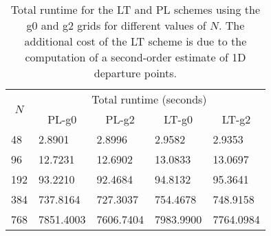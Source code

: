 \begin{table}[!h]
	\begin{tabular}{|l|llll|}
		\hline
		\multicolumn{1}{|c|}{\multirow{2}{*}{\textbf{$N$}}} & \multicolumn{4}{c|}{Total runtime (seconds)}                                                                              \\ \cline{2-5} 
		\multicolumn{1}{|c|}{}                              & \multicolumn{1}{c|}{PL-g0}     & \multicolumn{1}{c|}{PL-g2}     & \multicolumn{1}{c|}{LT-g0}     & \multicolumn{1}{c|}{LT-g2} \\ \hline
		48                                                  & \multicolumn{1}{l|}{2.8901}    & \multicolumn{1}{l|}{2.8996}    & \multicolumn{1}{l|}{2.9582}    & 2.9353                     \\ \hline
		96                                                  & \multicolumn{1}{l|}{12.7231}   & \multicolumn{1}{l|}{12.6902}   & \multicolumn{1}{l|}{13.0833}   & 13.0697                    \\ \hline
		192                                                 & \multicolumn{1}{l|}{93.2210}   & \multicolumn{1}{l|}{92.4684}   & \multicolumn{1}{l|}{94.8132}   & 95.3641                    \\ \hline
		384                                                 & \multicolumn{1}{l|}{737.8164}  & \multicolumn{1}{l|}{727.3037}  & \multicolumn{1}{l|}{754.4678}  & 748.9158                   \\ \hline
		768                                                 & \multicolumn{1}{l|}{7851.4003} & \multicolumn{1}{l|}{7606.7404} & \multicolumn{1}{l|}{7983.9900} & 7764.0984                  \\ \hline
	\end{tabular}
	\caption{Total runtime for the LT and PL schemes using the g0 and g2 grids for different values of $N$.
		The additional cost of the LT scheme is due to the computation of a second-order estimate of 1D departure points.}
\label{sw-time}
\end{table}


